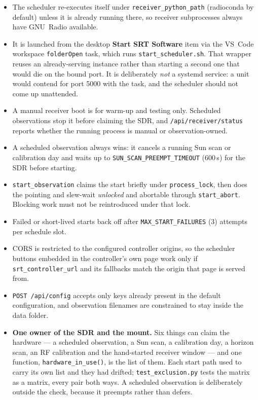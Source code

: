 \documentclass[11pt,a4paper]{article}
\begin{document}
\begin{itemize}
    \item The scheduler re-executes itself under \texttt{receiver\_python\_path} (radioconda by default) unless it is already running there, so receiver subprocesses always have GNU~Radio available.
    \item It is launched from the desktop \textbf{Start SRT Software} item via the VS~Code workspace \texttt{folderOpen} task, which runs \texttt{start\_scheduler.sh}. That wrapper reuses an already-serving instance rather than starting a second one that would die on the bound port. It is deliberately \emph{not} a systemd service: a unit would contend for port 5000 with the task, and the scheduler should not come up unattended.
    \item A manual receiver boot is for warm-up and testing only. Scheduled observations stop it before claiming the SDR, and \texttt{/api/receiver/status} reports whether the running process is manual or observation-owned.
    \item A scheduled observation always wins: it cancels a running Sun scan or calibration day and waits up to \texttt{SUN\_SCAN\_PREEMPT\_TIMEOUT} (600\,s) for the SDR before starting.
    \item \texttt{start\_observation} claims the start briefly under \texttt{process\_lock}, then does the pointing and slew-wait \emph{unlocked} and abortable through \texttt{start\_abort}. Blocking work must not be reintroduced under that lock.
    \item Failed or short-lived starts back off after \texttt{MAX\_START\_FAILURES} (3) attempts per schedule slot.
    \item CORS is restricted to the configured controller origins, so the scheduler buttons embedded in the controller's own page work only if \texttt{srt\_controller\_url} and its fallbacks match the origin that page is served from.
    \item \texttt{POST /api/config} accepts only keys already present in the default configuration, and observation filenames are constrained to stay inside the data folder.
    \item \textbf{One owner of the SDR and the mount.} Six things can claim the hardware --- a scheduled observation, a Sun scan, a calibration day, a horizon scan, an RF calibration and the hand-started receiver window --- and one function, \texttt{hardware\_in\_use()}, is the list of them. Each start path used to carry its own list and they had drifted; \texttt{test\_exclusion.py} tests the matrix as a matrix, every pair both ways. A scheduled observation is deliberately outside the check, because it preempts rather than defers.

\end{itemize}
\end{document}
